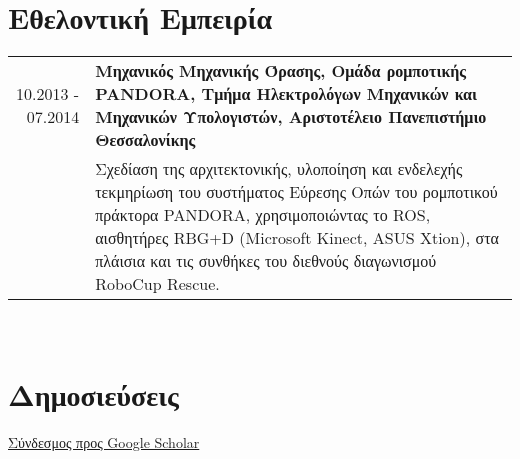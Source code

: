 \documentclass[a4paper,10pt,twoside]{article}
\begin{document}

\section{Εθελοντική Εμπειρία}

\begin{tabular}{rp{12cm}}
10.2013 - 07.2014 & \textbf{Μηχανικός Μηχανικής Όρασης, Ομάδα ρομποτικής PANDORA,
                    Τμήμα Ηλεκτρολόγων Μηχανικών και Μηχανικών Υπολογιστών, Αριστοτέλειο Πανεπιστήμιο Θεσσαλονίκης} \\
                  & Σχεδίαση της αρχιτεκτονικής, υλοποίηση και ενδελεχής τεκμηρίωση
                    του συστήματος Εύρεσης Οπών του ρομποτικού πράκτορα PANDORA, χρησιμοποιώντας το ROS, αισθητήρες RBG+D
                    (Microsoft Kinect, ASUS Xtion), στα πλάισια και τις συνθήκες του διεθνούς διαγωνισμού RoboCup Rescue.\\
\end{tabular} \\

\section{Δημοσιεύσεις}

\href{https://scholar.google.com/citations?view\_op=list\_works\&hl=en\&user=9\_hI4hMAAAAJ}{Σύνδεσμος προς Google Scholar}\\

{
\\

\\

\\

\\

\\

\\

\\

\\

\\

\\

\\

}
\end{document}

